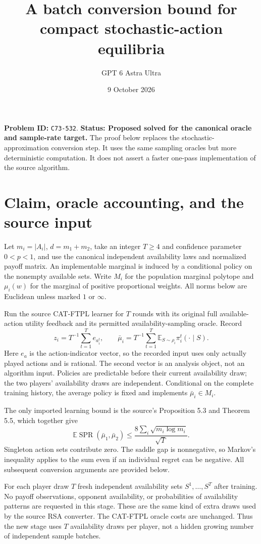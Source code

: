 \documentclass[11pt,a4paper]{article}
\title{A batch conversion bound for compact stochastic-action equilibria}
\author{GPT 6 Astra Ultra}\date{9 October 2026}
\newcommand{\E}{\mathbb E}
\begin{document}
\maketitle
\textbf{Problem ID:} \texttt{C73-532}. \textbf{Status: Proposed solved for the canonical oracle and sample-rate target.} The proof below replaces the stochastic-approximation conversion step. It uses the same sampling oracles but more deterministic computation. It does not assert a faster one-pass implementation of the source algorithm.

\section{Claim, oracle accounting, and the source input}
Let $m_i=|A_i|$, $d=m_1+m_2$, take an integer $T\ge4$ and confidence parameter $0<p<1$, and use the canonical independent availability laws and normalized payoff matrix. An implementable marginal is induced by a conditional policy on the nonempty available sets. Write $M_i$ for the population marginal polytope and $\mu_i(w)$ for the marginal of positive proportional weights. All norms below are Euclidean unless marked $1$ or $\infty$.

Run the source CAT-FTPL learner for $T$ rounds with its original full available-action utility feedback and its permitted availability-sampling oracle. Record
\[
 z_i=T^{-1}\sum_{t=1}^T e_{a_i^t},\qquad
 \bar\mu_i=T^{-1}\sum_{t=1}^T\E_{S\sim\rho_i}\pi_i^t(\cdot\mid S).
\]
Here $e_a$ is the action-indicator vector, so the recorded input uses only actually played actions and is rational. The second vector is an analysis object, not an algorithm input. Policies are predictable before their current availability draw; the two players' availability draws are independent. Conditional on the complete training history, the average policy is fixed and implements $\bar\mu_i\in M_i$.

The only imported learning bound is the source's Proposition 5.3 and Theorem 5.5, which together give
\[
 \E\operatorname{SPR}(\bar\mu_1,\bar\mu_2)
 \le \frac{8\sum_i\sqrt{m_i\log m_i}}{\sqrt T}. \tag{1}
\]
Singleton action sets contribute zero. The saddle gap is nonnegative, so Markov's inequality applies to the sum even if an individual regret can be negative. All subsequent conversion arguments are provided below.

For each player draw $T$ fresh independent availability sets $S^1,\ldots,S^T$ after training. No payoff observations, opponent availability, or probabilities of availability patterns are requested in this stage. These are the same kind of extra draws used by the source RSA converter. The CAT-FTPL oracle costs are unchanged. Thus the new stage uses $T$ availability draws per player, not a hidden growing number of independent sample batches.
\end{document}
